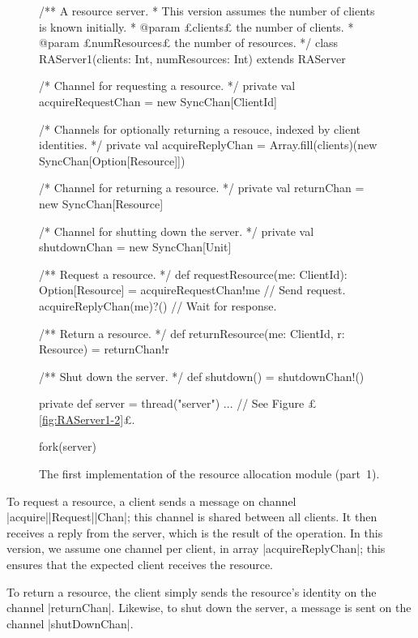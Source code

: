 \begin{figure}
\begin{scala}
/** A resource server. 
  * This version assumes the number of clients is known initially. 
  * @param £clients£ the number of clients.
  * @param £numResources£ the number of resources.  */
class RAServer1(clients: Int, numResources: Int) extends RAServer{

  /* Channel for requesting a resource. */
  private val acquireRequestChan = new SyncChan[ClientId]

  /* Channels for optionally returning a resouce, indexed by client identities. */
  private val acquireReplyChan = 
    Array.fill(clients)(new SyncChan[Option[Resource]])

  /* Channel for returning a resource. */
  private val returnChan = new SyncChan[Resource]

  /* Channel for shutting down the server. */
  private val shutdownChan = new SyncChan[Unit]

  /** Request a resource. */
  def requestResource(me: ClientId): Option[Resource] = {
    acquireRequestChan!me  // Send request.
    acquireReplyChan(me)?() // Wait for response.
  }

  /** Return a resource. */
  def returnResource(me: ClientId, r: Resource) = returnChan!r

  /** Shut down the server. */
  def shutdown() = shutdownChan!()

  private def server = thread("server"){ ...  } // See Figure £\ref{fig:RAServer1-2}£.

  fork(server)
}
\end{scala}
\caption{The first implementation of the resource allocation module (part~1).}
\label{fig:RAServer1-1} 
\end{figure}


To request a resource, a client sends a message on channel
|acquire|\-|Request|\-|Chan|; this channel is shared between all clients.  It
then receives a reply from the server, which is the result of the operation.
In this version, we assume one channel per client, in array
|acquireReplyChan|; this ensures that the expected client receives the
resource.

To return a resource, the client simply sends the resource's identity on the
channel |returnChan|.  Likewise, to shut down the server, a message is sent on
the channel |shutDownChan|.


